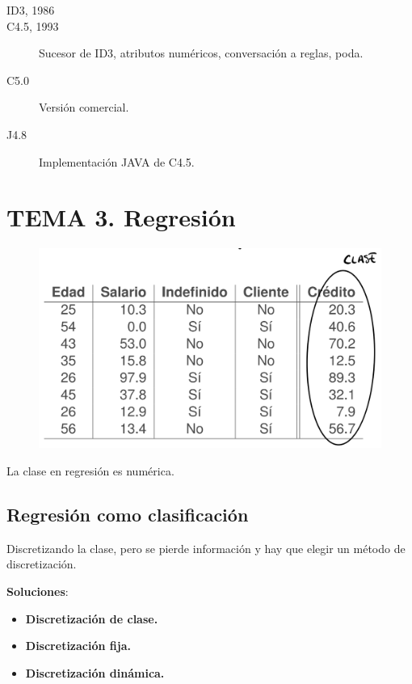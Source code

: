 \documentclass[12pt]{report} %
\begin{document}
\begin{description}
	\item[ID3, 1986]
	\item[C4.5, 1993] Sucesor de ID3, atributos numéricos, conversación a reglas, poda.
	\item[C5.0] Versión comercial.
	\item[J4.8] Implementación JAVA de C4.5.
\end{description}

\chapter{TEMA 3. Regresión}
\begin{figure}[H]
	{\includegraphics[scale=.2]{image-20210305210244509.png}}
\end{figure}
La clase en regresión es numérica.

\section{Regresión como
clasificación}

Discretizando la clase, pero se pierde información y hay que elegir un
método de discretización.

\textbf{Soluciones}:

\begin{itemize}

\item
  \textbf{Discretización de clase.}
\item
  \textbf{Discretización fija.}
\item
  \textbf{Discretización dinámica.}
\end{itemize}
\end{document}
